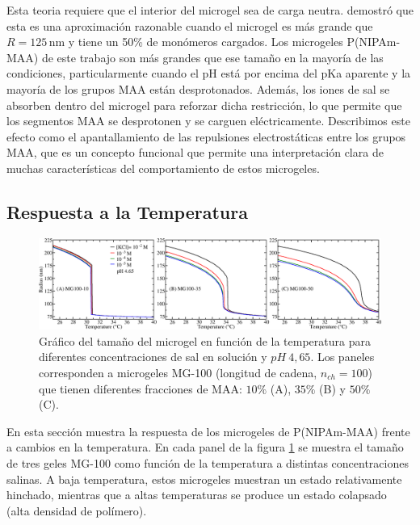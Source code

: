 Esta teoria requiere que el interior del microgel sea de carga neutra.
\citet{Claudio2009}demostr\'o que esta es una aproximación razonable cuando el microgel es m\'as grande que $R=125\,\text{nm}$ y tiene un 50\% de mon\'omeros cargados.
Los microgeles P(NIPAm-MAA) de este trabajo son m\'as grandes que ese tama\~no en la mayor\'ia de las condiciones, particularmente cuando el pH está por encima del pKa aparente y la mayor\'ia de los grupos MAA est\'an desprotonados.
Adem\'as, los iones de sal se absorben dentro del microgel para reforzar dicha restricci\'on, lo que permite que los segmentos MAA se desprotonen y se carguen el\'ectricamente.
Describimos este efecto como el apantallamiento de las repulsiones electrost\'aticas entre los grupos MAA, que es un concepto funcional que permite una interpretaci\'on clara de muchas caracter\'isticas del comportamiento de estos microgeles. %




\subsection{Respuesta a la Temperatura}\label{sec:temperature}

\begin{figure}[!htb]
	\centering
	\includegraphics[width=1\linewidth]{Figures/graph-gel/R-T.png}
	\caption{Gr\'afico del tama\~no del microgel en funci\'on de la temperatura para diferentes concentraciones de sal en soluci\'on y $pH~4,65$.
		Los paneles corresponden a microgeles MG-100 (longitud de cadena, $n_{ch}=100$) que tienen diferentes fracciones de MAA: $10\%$ (A), $35\%$ (B) y $50\%$ (C).}
	\label{fig:R-T}
\end{figure}


En esta secci\'on muestra la respuesta de los microgeles de P(NIPAm-MAA) frente a cambios en la temperatura.
En cada panel de la figura \ref{fig:R-T} se muestra el tama\~no de tres geles MG-100 como funci\'on de la temperatura a distintas concentraciones salinas.
A baja temperatura, estos microgeles muestran un estado relativamente hinchado, mientras que a altas temperaturas se produce un estado colapsado (alta densidad de pol\'imero).


